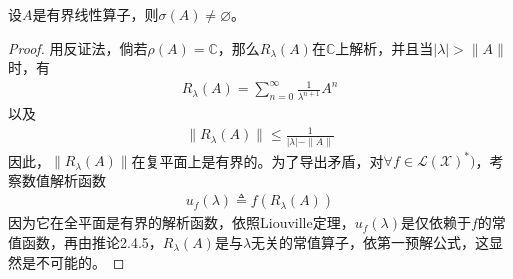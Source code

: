 	
	\begin{theorem}
		设$A$是有界线性算子，则$\sigma(A)\neq\varnothing$。
	\end{theorem}
	\begin{proof}
		用反证法，倘若$\rho(A) = \mathbb{C}$，那么$R_{\lambda}(A)$在$\mathbb{C}$上解析，并且当$|\lambda| > \|A\|$时，有
		\begin{align*}
			R_{\lambda}(A) = \sum\limits_{n=0}^{\infty} \frac{1}{\lambda^{n+1}} A^n
		\end{align*}
		以及
		\begin{align*}
			\|R_{\lambda}(A)\| \leqslant \frac{1}{|\lambda| - \|A\|}
		\end{align*}
		因此，$\|R_{\lambda}(A)\|$在复平面上是有界的。为了导出矛盾，对$\forall f\in\mathscr{L}(\mathscr{X})^*)$，考察数值解析函数
		\begin{align*}
			u_f(\lambda) \triangleq f(R_{\lambda}(A))
		\end{align*}
		因为它在全平面是有界的解析函数，依照Liouville定理，$u_f(\lambda)$是仅依赖于$f$的常值函数，再由推论2.4.5，$R_{\lambda}(A)$是与$\lambda$无关的常值算子，依第一预解公式，这显然是不可能的。
	\end{proof}
	
	
